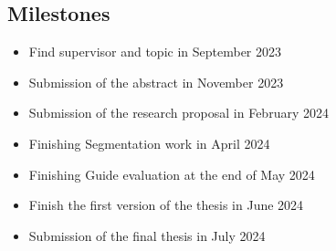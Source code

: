 \subsection{Milestones}
\begin{body}
	\begin{itemize}
		\item Find supervisor and topic in September 2023
		\item Submission of the abstract in November 2023
		\item Submission of the research proposal in February 2024
		\item Finishing Segmentation work in April 2024
		\item Finishing Guide evaluation at the end of May 2024
		\item Finish the first version of the thesis in June 2024
		\item Submission of the final thesis in July 2024
	\end{itemize}
\end{body}


